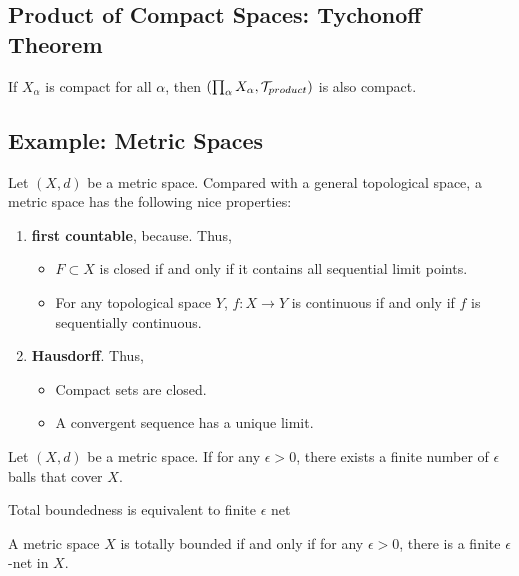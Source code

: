 \subsection{Product of Compact Spaces: Tychonoff Theorem}

\begin{theorem}[Tychonoff]
    If $X_\alpha$ is compact for all $\alpha$, then $(\prod_{\alpha}X_{\alpha},\mathcal{T}_{product})$ is also compact.
\end{theorem}

\subsection{Example: Metric Spaces}

Let $(X,d)$ be a metric space.
Compared with a general topological space, a metric space has the following nice properties:
\begin{enumerate}[label=(\roman*)]
    \item \textbf{first countable}, because. Thus,
    \begin{itemize}
        \item $F\subset X$ is closed if and only if it contains all sequential limit points.
        \item For any topological space $Y$, $f:X\to Y$ is continuous if and only if $f$ is sequentially continuous.
    \end{itemize} 
    \item \textbf{Hausdorff}. Thus,
    \begin{itemize}
        \item Compact sets are closed.
        \item A convergent sequence has a unique limit.
    \end{itemize}
\end{enumerate}

\begin{definition}
    Let $(X,d)$ be a metric space. If for any $\epsilon>0$, there exists a finite number of $\epsilon$ balls that cover $X$.
\end{definition}

\begin{definition}
    
\end{definition}

Total boundedness is equivalent to finite $\epsilon$ net
\begin{proposition}
    A metric space $X$ is totally bounded if and only if for any $\epsilon>0$, there is a finite $\epsilon$-net in $X$.
\end{proposition}

